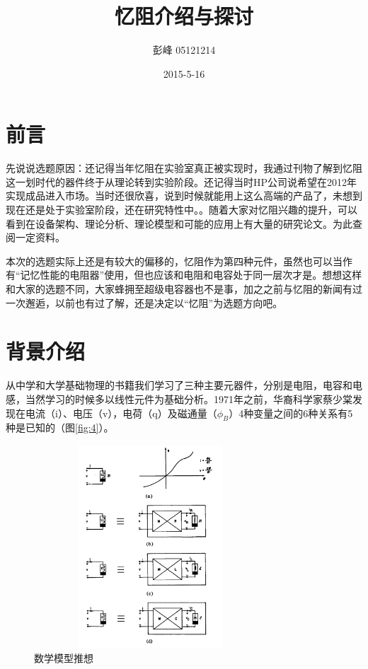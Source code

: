 \documentclass[UTF8]{article}
\begin{document}
 
\author{    彭峰     05121214   }
 \date{2015-5-16}
\title{忆阻介绍与探讨}  %
\titlelabel{\S\thetitle\quad}
\maketitle%

\section{前言}
先说说选题原因：还记得当年忆阻在实验室真正被实现时，我通过刊物了解到忆阻这一划时代的器件终于从理论转到实验阶段。还记得当时HP公司说希望在2012年实现成品进入市场。当时还很欣喜，说到时候就能用上这么高端的产品了，未想到现在还是处于实验室阶段，还在研究特性中。。随着大家对忆阻兴趣的提升，可以看到在设备架构、理论分析、理论模型和可能的应用上有大量的研究论文\cite{mem10}。为此查阅一定资料。

本次的选题实际上还是有较大的偏移的，忆阻作为第四种元件，虽然也可以当作有“记忆性能的电阻器”使用，但也应该和电阻和电容处于同一层次才是。想想这样和大家的选题不同，大家蜂拥至超级电容器也不是事，加之之前与忆阻的新闻有过一次邂逅，以前也有过了解，还是决定以“忆阻”为选题方向吧。

\section{背景介绍}
从中学和大学基础物理的书籍我们学习了三种主要元器件，分别是电阻，电容和电感，当然学习的时候多以线性元件为基础分析。1971年之前，华裔科学家蔡少棠发现在电流（i）、电压（v），电荷（q）及磁通量（$\phi_{B}$）4种变量之间的6种关系有5种是已知的（图\eqref{fig:4}）。
\begin{figure}[htbp]
\centering
\includegraphics[width=3.42in,height=3in]{pic/4}
\caption{数学模型推想}
\label{fig:4}
\end{figure}
\end{document}
